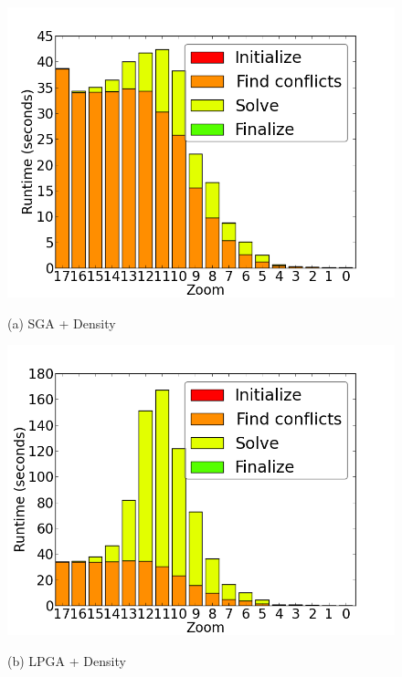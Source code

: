 \begin{figure}[tb]
  \begin{minipage}{0.329\linewidth}
    \centerline{\includegraphics[width=1.0\linewidth]{./figs/prelim_pnt_500k_tourism_heuristic_A.png}}
    \centerline{(a) SGA + Density}
  \end{minipage} \hfill
  \begin{minipage}{0.329\linewidth}
    \centerline{\includegraphics[width=1.0\linewidth]{./figs/prelim_pnt_500k_tourism_lp_A.png}}
    \centerline{(b) LPGA + Density}
  \end{minipage} \hfill
  \begin{minipage}{0.329\linewidth}

\end{minipage}
\end{figure}

